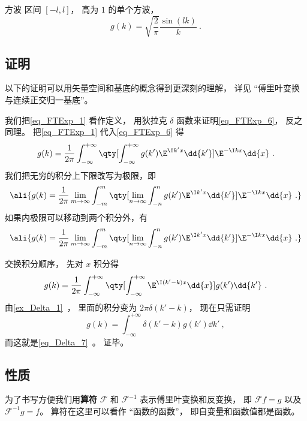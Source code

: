 \begin{example}{方波}
区间 $[-l,l]$， 高为 $1$ 的单个方波，
\begin{equation}
g(k) = \sqrt{\frac{2}{\pi}} \frac{\sin(lk)}{k}~.
\end{equation}
\end{example}

\subsection{证明}

以下的证明可以用矢量空间和基底的概念得到更深刻的理解， 详见 “傅里叶变换与连续正交归一基底”。

我们把\autoref{eq_FTExp_1} 看作定义， 用狄拉克 $\delta$ 函数来证明\autoref{eq_FTExp_6}， 反之同理。 把\autoref{eq_FTExp_1} 代入\autoref{eq_FTExp_6} 得
\begin{equation}
g(k) = \frac{1}{2\pi} \int_{-\infty}^{+\infty} \qty[ \int_{-\infty}^{+\infty} g(k') \E^{\I k' x} \dd{k'}] \E^{-\I k x} \dd{x}~.
\end{equation}
我们把无穷的积分上下限改写为极限，即
\begin{equation}\ali{
g(k) = \frac{1}{2\pi} \lim_{m\to\infty}\int_{-m}^{m} \qty[\lim_{n\to\infty} \int_{-n}^{n} g(k') \E^{\I k' x} \dd{k'}] \E^{-\I k x} \dd{x}~.
}\end{equation}
如果内极限可以移动到两个积分外，有
\begin{equation}\ali{
g(k) = \frac{1}{2\pi} \lim_{m\to\infty}\int_{-m}^{m} \qty[\lim_{n\to\infty} \int_{-n}^{n} g(k') \E^{\I k' x} \dd{k'}] \E^{-\I k x} \dd{x}~.
}\end{equation}



交换积分顺序， 先对 $x$ 积分得
\begin{equation}
g(k) = \frac{1}{2\pi} \int_{-\infty}^{+\infty} \qty[ \int_{-\infty}^{+\infty}  \E^{\I (k'-k) x} \dd{x}]  g(k')\dd{k'}~.
\end{equation}
由\autoref{ex_Delta_1}~， 里面的积分变为 $2\pi\delta(k'-k)$， 现在只需证明
\begin{equation}
g(k) = \int_{-\infty}^{+\infty} \delta(k'-k)  g(k')\dd{k'}~,
\end{equation}
而这就是\autoref{eq_Delta_7}~。 证毕。

\subsection{性质}
为了书写方便我们用\textbf{算符} $\mathcal F$ 和 $\mathcal F^{-1}$ 表示傅里叶变换和反变换， 即 $\mathcal F f = g$ 以及 $\mathcal F^{-1} g = f$。 算符在这里可以看作 “函数的函数”， 即自变量和函数值都是函数。

